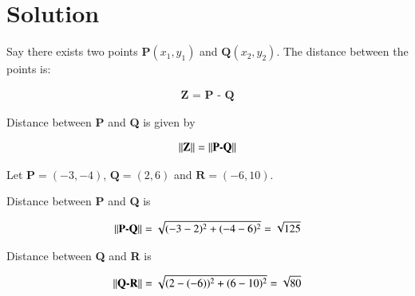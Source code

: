 \documentclass[journal,12pt,twocolumn]{IEEEtran}
\begin{document}



\section{Solution}

Say there exists two points $\textbf{P}(x_1, y_1)$ and $\textbf{Q}(x_2, y_2)$. The distance between the points is:

\begin{align}
    \textbf{Z = P - Q}
\end{align}

Distance between \textbf{P} and \textbf{Q} is given by 


\begin{align}
||\textbf{Z}|| = \left\lVert\textbf{P-Q}\right\rVert
\end{align}



Let $\textbf{P} = (-3, -4)$, $\textbf{Q} = (2, 6)$ and $\textbf{R} = (-6, 10)$.

Distance between \textbf{P} and \textbf{Q} is 

\begin{align}
\left\lVert\textbf{P-Q}\right\rVert = \sqrt{(-3-2)^2+(-4-6)^2}
=\sqrt{125}
\end{align}

Distance between \textbf{Q} and \textbf{R} is 

\begin{align}
\left\lVert\textbf{Q-R}\right\rVert = \sqrt{(2-(-6))^2+(6-10)^2}
=\sqrt{80}
\end{align}
\end{document}
